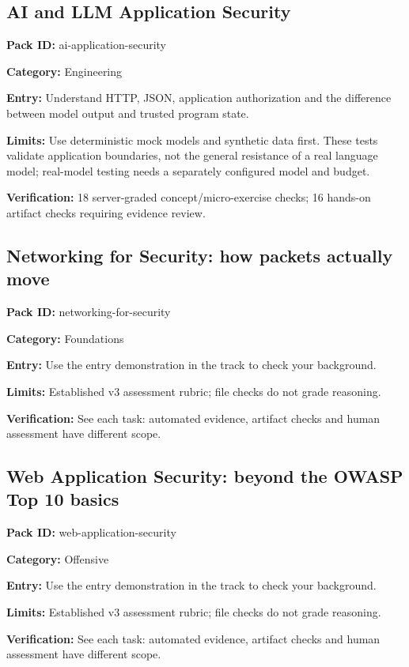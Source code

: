 \subsection{AI and LLM Application Security}
\noindent\textbf{Pack ID:} ai-application-security\par
\noindent\textbf{Category:} Engineering\par
\noindent\textbf{Entry:} Understand HTTP, JSON, application authorization and the difference between model output and trusted program state.\par
\noindent\textbf{Limits:} Use deterministic mock models and synthetic data first. These tests validate application boundaries, not the general resistance of a real language model; real-model testing needs a separately configured model and budget.\par
\noindent\textbf{Verification:} 18 server-graded concept/micro-exercise checks; 16 hands-on artifact checks requiring evidence review.\par
\subsection{Networking for Security: how packets actually move}
\noindent\textbf{Pack ID:} networking-for-security\par
\noindent\textbf{Category:} Foundations\par
\noindent\textbf{Entry:} Use the entry demonstration in the track to check your background.\par
\noindent\textbf{Limits:} Established v3 assessment rubric; file checks do not grade reasoning.\par
\noindent\textbf{Verification:} See each task: automated evidence, artifact checks and human assessment have different scope.\par
\subsection{Web Application Security: beyond the OWASP Top 10 basics}
\noindent\textbf{Pack ID:} web-application-security\par
\noindent\textbf{Category:} Offensive\par
\noindent\textbf{Entry:} Use the entry demonstration in the track to check your background.\par
\noindent\textbf{Limits:} Established v3 assessment rubric; file checks do not grade reasoning.\par
\noindent\textbf{Verification:} See each task: automated evidence, artifact checks and human assessment have different scope.\par
